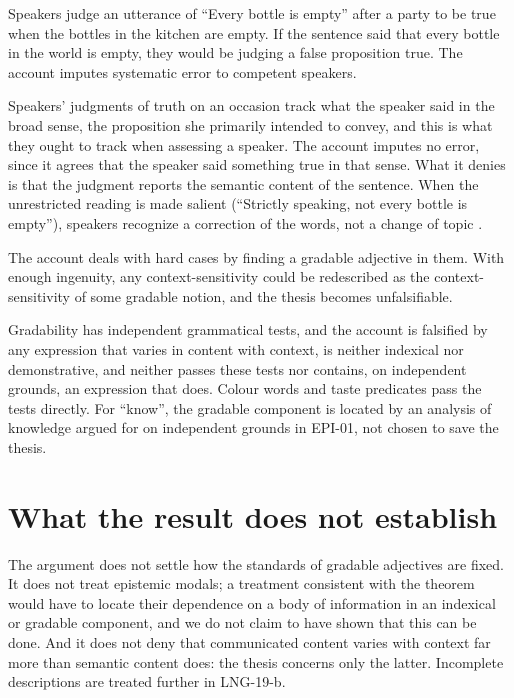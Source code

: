 \documentclass{situationist-preprint}
\begin{document}
\begin{objection}\label{o:intuit}
Speakers judge an utterance of \enquote{Every bottle is empty} after a party to be true when the bottles in the kitchen are empty. If the sentence said that every bottle in the world is empty, they would be judging a false proposition true. The account imputes systematic error to competent speakers.
\end{objection}

\begin{reply}
Speakers' judgments of truth on an occasion track what the speaker said in the broad sense, the proposition she primarily intended to convey, and this is what they ought to track when assessing a speaker. The account imputes no error, since it agrees that the speaker said something true in that sense. What it denies is that the judgment reports the semantic content of the sentence. When the unrestricted reading is made salient (\enquote{Strictly speaking, not every bottle is empty}), speakers recognize a correction of the words, not a change of topic \citep{CappelenLepore2005}.
\end{reply}

\begin{objection}\label{o:adhoc}
The account deals with hard cases by finding a gradable adjective in them. With enough ingenuity, any context-sensitivity could be redescribed as the context-sensitivity of some gradable notion, and the thesis becomes unfalsifiable.
\end{objection}

\begin{reply}
Gradability has independent grammatical tests, and the account is falsified by any expression that varies in content with context, is neither indexical nor demonstrative, and neither passes these tests nor contains, on independent grounds, an expression that does. Colour words and taste predicates pass the tests directly. For \enquote{know}, the gradable component is located by an analysis of knowledge argued for on independent grounds in EPI-01, not chosen to save the thesis.
\end{reply}

\section{What the result does not establish}

The argument does not settle how the standards of gradable adjectives are fixed. It does not treat epistemic modals; a treatment consistent with the theorem would have to locate their dependence on a body of information in an indexical or gradable component, and we do not claim to have shown that this can be done. And it does not deny that communicated content varies with context far more than semantic content does: the thesis concerns only the latter. Incomplete descriptions are treated further in LNG-19-b.
\end{document}
